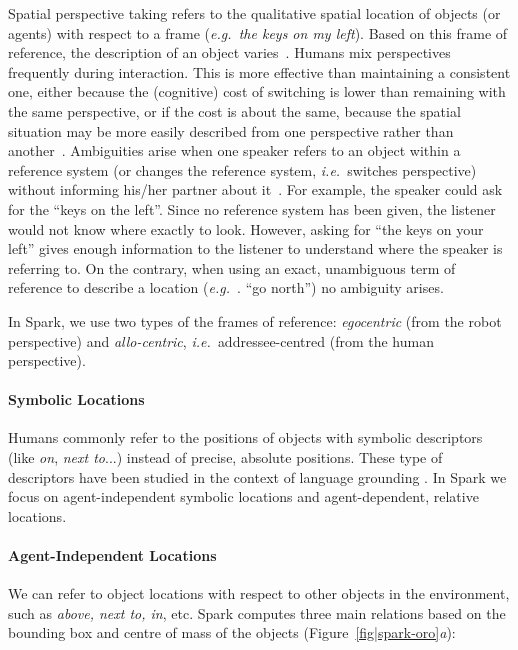 \documentclass[preprint,3p,times]{elsarticle}
\newcommand{\ie}{{\textit{i.e.\ }}}
\newcommand{\eg}{{\textit{e.g.\ }}}
\begin{document}
Spatial perspective taking refers to the qualitative spatial location of
objects (or agents) with respect to a frame (\eg \emph{the keys on my left}).
Based on this frame of reference, the description of an object
varies~\cite{Marin2008}. Humans mix perspectives frequently during interaction.
This is more effective than maintaining a consistent one, either because the
(cognitive) cost of switching is lower than remaining with the same
perspective, or if the cost is about the same, because the spatial situation
may be more easily described from one perspective rather than
another~\cite{Tversky1999}. Ambiguities arise when one speaker refers to an
object within a reference system (or changes the reference system, \ie switches
perspective) without informing his/her partner about it~\cite{Breazeal2006,
Ros2010}. For example, the speaker could ask for the ``keys on the left''.
Since no reference system has been given, the listener would not know where
exactly to look.  However, asking for ``the keys on your left'' gives enough
information to the listener to understand where the speaker is referring to. On
the contrary, when using an exact, unambiguous term of reference to describe a
location (\eg. ``go north'') no ambiguity arises.

In {\sc Spark}, we use two types of the frames of reference: \emph{egocentric}
(from the robot perspective) and \emph{allo-centric}, \ie addressee-centred
(from the human perspective).

\paragraph{Symbolic Locations}

Humans commonly refer to the positions of objects with symbolic descriptors
(like \emph{on}, \emph{next to}...) instead of precise, absolute positions.
These type of descriptors have been studied in the context of language
grounding \cite{O'Keefe1999,Matuszek2010,Regier2001,Kelleher2006,Blisard2005}.
In {\sc Spark} we focus on agent-independent symbolic locations and agent-dependent,
relative locations.

\paragraph{Agent-Independent Locations}

We can refer to object locations with respect to other objects in the
environment, such as \emph{above, next to, in}, etc. {\sc Spark} computes
three main relations based on the bounding box and centre of mass of the
objects (Figure~\ref{fig|spark-oro}\emph{a}):
\end{document}
